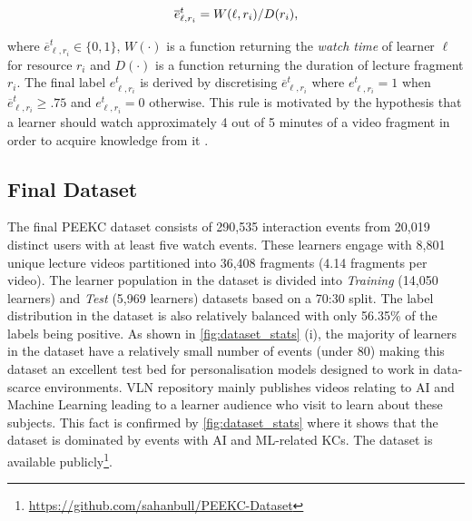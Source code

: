 \documentclass[letterpaper]{article} %
\begin{document}
\begin{equation} \label{eq:norm_engage}\centering 
\overline{e}^t_{\ell,r_i} = W(\ell,r_i) / D(r_i),
\end{equation}

where $\overline{e}^t_{\ell,r_i} \in \{0,1\}$, $W(\cdot)$ is a function returning the \emph{watch time} of learner $\ell$ for resource $r_i$ and $D(\cdot)$ is a function returning the duration of lecture fragment $r_i$. The final label $e^t_{\ell,r_i}$ is derived by discretising $\overline{e}^t_{\ell,r_i}$ where $e^t_{\ell,r_i} = 1 $ when $\overline{e}^t_{\ell,r_i} \geq .75$ and $e^t_{\ell,r_i} = 0$ otherwise. This rule is motivated by the hypothesis that a learner should watch approximately 4 out of 5 minutes of a video fragment in order to acquire knowledge from it \cite{truelearn}.

\subsection{Final Dataset}

The final PEEKC dataset consists of 290,535 interaction events from 20,019 distinct users with at least five watch events. These learners engage with 8,801 unique lecture videos partitioned into 36,408 fragments (4.14 fragments per video). The learner population in the dataset is divided into \emph{Training} (14,050 learners) and \emph{Test} (5,969 learners) datasets based on a 70:30 split. The label distribution in the dataset is also relatively balanced with only 56.35\% of the labels being positive. As shown in \figurename{ \ref{fig:dataset_stats} (i)}, the majority of learners in the dataset have a relatively small number of events (under 80) making this dataset an excellent test bed for personalisation models designed to work in data-scarce environments. VLN repository mainly publishes videos relating to AI and Machine Learning leading to a learner audience who visit to learn about these subjects. This fact is confirmed by \figurename{ \ref{fig:dataset_stats}} where it shows that the dataset is dominated by events with AI and ML-related KCs. The dataset is available publicly\footnote{\url{https://github.com/sahanbull/PEEKC-Dataset}}.


    
\end{document}
